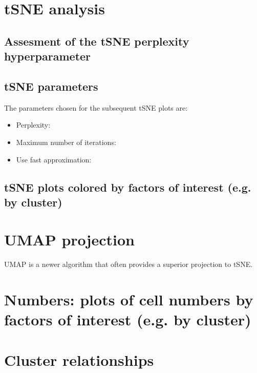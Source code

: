 \section{tSNE analysis}

\subsection{Assesment of the tSNE perplexity hyperparameter}


\clearpage

\subsection{tSNE parameters}

The parameters chosen for the subsequent tSNE plots are:

\begin{itemize}
\item Perplexity: \tSNEPerplexity
\item Maximum number of iterations: \tSNEMaxIter
\item Use fast approximation: \tSNEFast
\end{itemize}

\subsection{tSNE plots colored by factors of interest (e.g. by cluster)}



\clearpage

\section{UMAP projection}

UMAP is a newer algorithm that often provides a superior projection to tSNE.



\clearpage

\section{Numbers: plots of cell numbers by factors of interest (e.g. by cluster)}



\clearpage

\section{Cluster relationships}

